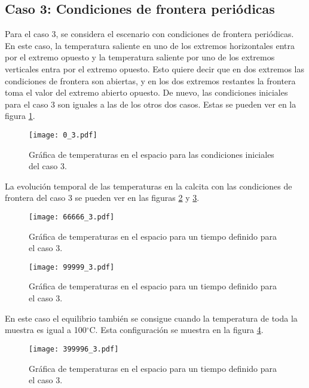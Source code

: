 \documentclass[10pt, twocolumn]{article}
\begin{document}
\subsection{Caso 3: Condiciones de frontera periódicas}
Para el caso 3, se considera el escenario con condiciones de frontera periódicas. En este caso, la temperatura saliente en uno de los extremos horizontales entra por el extremo opuesto y la temperatura saliente por uno de los extremos verticales entra por el extremo opuesto. Esto quiere decir que en dos extremos las condiciones de frontera son abiertas, y en los dos extremos restantes la frontera toma el valor del extremo abierto opuesto. De nuevo, las condiciones iniciales para el caso 3 son iguales a las de los otros dos casos. Estas se pueden ver en la figura \ref{c3_ini}.
\begin{figure}[h]
\centering
\texttt{[image: 0\_3.pdf]}
\caption{Gráfica de temperaturas en el espacio para las condiciones iniciales del caso 3.}
\label{c3_ini}
\end{figure}
La evolución temporal de las temperaturas en la calcita con las condiciones de frontera del caso 3 se pueden ver en las figuras \ref{c3_g1} y \ref{c3_g2}.
\begin{figure}[h]
\centering
\texttt{[image: 66666\_3.pdf]}
\caption{Gráfica de temperaturas en el espacio para un tiempo definido para el caso 3.}
\label{c3_g1}
\end{figure}
\begin{figure}[h]
\centering
\texttt{[image: 99999\_3.pdf]}
\caption{Gráfica de temperaturas en el espacio para un tiempo definido para el caso 3.}
\label{c3_g2}
\end{figure}
En este caso el equilibrio también se consigue cuando la temperatura de toda la muestra es igual a 100$^\circ$C. Esta configuración se muestra en la figura \ref{c3_equi}.
\begin{figure}[h]
\centering
\texttt{[image: 399996\_3.pdf]}
\caption{Gráfica de temperaturas en el espacio para un tiempo definido para el caso 3.}
\label{c3_equi}
\end{figure}
\end{document}
